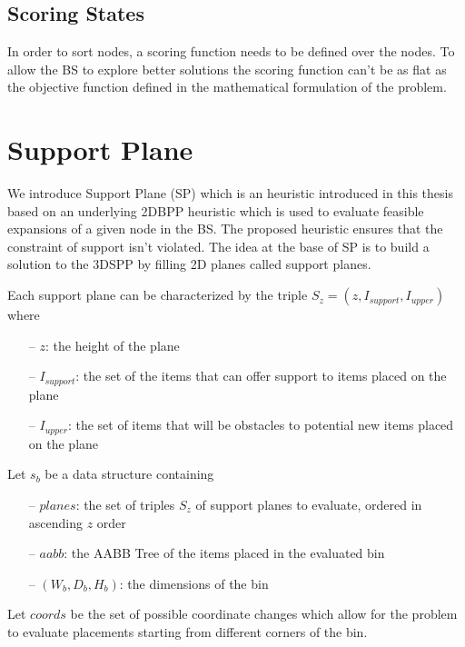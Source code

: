 

\subsection{Scoring States}\label{chapter:heuristics:beamsearch:scoring}
In order to sort nodes, a scoring function needs to be defined over the nodes. 
To allow the BS to explore better solutions the scoring function can't be as flat as the objective function defined in the mathematical formulation of the problem. %

\section{Support Plane}\label{chapter:heuristics:supportplane}
We introduce Support Plane (SP) which is an heuristic introduced in this thesis based on an underlying 2DBPP heuristic which is used to evaluate feasible expansions of a given node in the BS.
The proposed heuristic ensures that the constraint of support isn't violated.
The idea at the base of SP is to build a solution to the 3DSPP by filling 2D planes called support planes.

Each support plane can be characterized by the triple $S_z = (z, I_{support}, I_{upper})$ where
\begin{itemize}
    \item[--] $z$: the height of the plane 
    \item[--] $I_{support}$: the set of the items that can offer support to items placed on the plane
    \item[--] $I_{upper}$: the set of items that will be obstacles to potential new items placed on the plane %
\end{itemize}%

Let $s_b$ be a data structure containing
\begin{itemize}
    \item[--] $planes$: the set of triples $S_z$ of support planes to evaluate, ordered in ascending $z$ order
    \item[--] $aabb$: the AABB Tree of the items placed in the evaluated bin
    \item[--] $(W_{b}, D_{b}, H_{b})$: the dimensions of the bin
\end{itemize}

Let $coords$ be the set of possible coordinate changes which allow for the problem to evaluate placements starting from different corners of the bin. %

